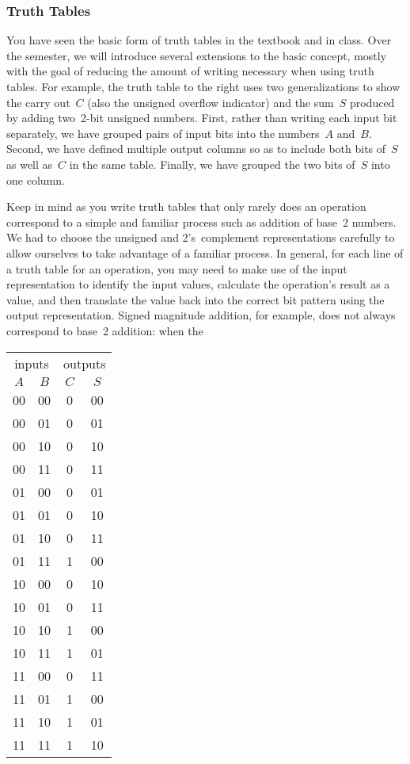 \begin{minipage}{5.00in}
\subsubsection{Truth Tables}\mpline

You have seen the basic form of truth tables in the textbook and in class.
Over the semester, we will introduce several
extensions to the basic concept, mostly with the
goal of reducing the amount of writing necessary when using truth
tables.  For example, the truth table to the right uses two generalizations
to show the carry out~$C$ (also the unsigned overflow indicator) and the 
sum~$S$ produced by
adding two~\mbox{2-bit} unsigned numbers.
First, rather than writing each input bit separately, we have grouped
pairs of input bits into the numbers~$A$ and~$B$.  
Second, we have defined multiple 
output columns so as to include both bits of~$S$ as well as~$C$ in 
the same table.
Finally, we have 
grouped the two bits of~$S$ into one column.\mpline

Keep in mind as you write truth tables that only rarely does an operation
correspond to a simple and familiar process such as addition of base~2
numbers.  We had to choose the unsigned and 2's~complement representations
carefully to allow ourselves to take advantage of a familiar process.
In general, for each line of a truth table for an operation, you may
need to make use of the input representation to identify the input values,
calculate the operation's result as a value, and then translate the value
back into the correct bit pattern using the output representation.
Signed magnitude addition, for example, does not always correspond to
base~2 addition: when the\linebreak
\end{minipage}\hspace{.25in}%
\begin{minipage}{1.25in}
\begin{tabular}{cc|cc}
\multicolumn{2}{c|}{inputs}& \multicolumn{2}{c}{outputs}\\
$A$& $B$& $C$& $S$\\ \hline
00& 00& 0& 00\\
00& 01& 0& 01\\
00& 10& 0& 10\\
00& 11& 0& 11\\
01& 00& 0& 01\\
01& 01& 0& 10\\
01& 10& 0& 11\\
01& 11& 1& 00\\
10& 00& 0& 10\\
10& 01& 0& 11\\
10& 10& 1& 00\\
10& 11& 1& 01\\
11& 00& 0& 11\\
11& 01& 1& 00\\
11& 10& 1& 01\\
11& 11& 1& 10\\
\end{tabular}\vspace{12pt}
\end{minipage}\mpdone

